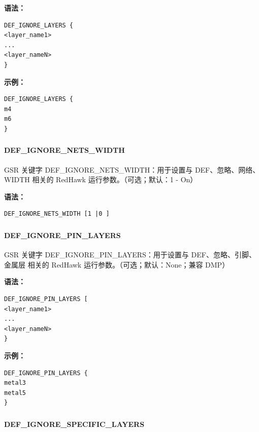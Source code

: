\textbf{语法：}
\begin{lstlisting}
DEF_IGNORE_LAYERS {
<layer_name1>
...
<layer_nameN>
}
\end{lstlisting}

\textbf{示例：}
\begin{lstlisting}
DEF_IGNORE_LAYERS {
m4
m6
}
\end{lstlisting}

\subsubsection{}
\paragraph*{DEF_IGNORE_NETS_WIDTH}

GSR 关键字 DEF_IGNORE_NETS_WIDTH：用于设置与 DEF、忽略、网络、WIDTH 相关的 RedHawk 运行参数。（可选；默认：1 - On）

\textbf{语法：}
\begin{lstlisting}
DEF_IGNORE_NETS_WIDTH [1 |0 ]
\end{lstlisting}

\subsubsection{}
\paragraph*{DEF_IGNORE_PIN_LAYERS}

GSR 关键字 DEF_IGNORE_PIN_LAYERS：用于设置与 DEF、忽略、引脚、金属层 相关的 RedHawk 运行参数。（可选；默认：None；兼容 DMP）

\textbf{语法：}
\begin{lstlisting}
DEF_IGNORE_PIN_LAYERS [
<layer_name1>
...
<layer_nameN>
}
\end{lstlisting}

\textbf{示例：}
\begin{lstlisting}
DEF_IGNORE_PIN_LAYERS {
metal3
metal5
}
\end{lstlisting}

\subsubsection{}
\paragraph*{DEF_IGNORE_SPECIFIC_LAYERS}

